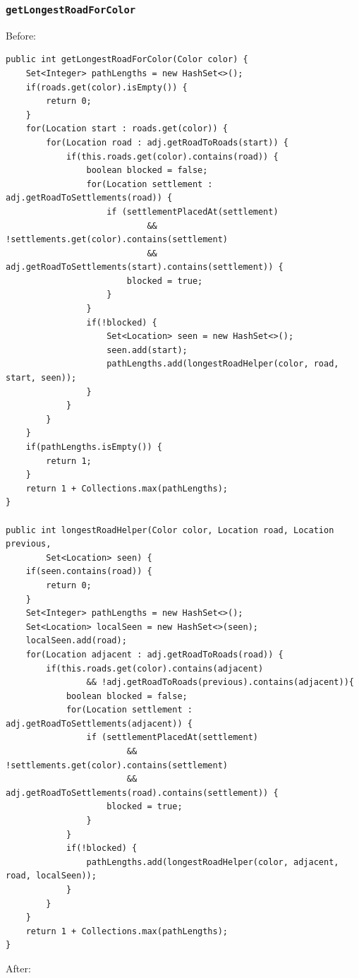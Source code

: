 \documentclass{fank1basedocument}
\begin{document}
\subsubsection*{\texttt{getLongestRoadForColor}}
Before:
\begin{lstlisting}[style=javacode,language=myJava]
public int getLongestRoadForColor(Color color) {
	Set<Integer> pathLengths = new HashSet<>();
	if(roads.get(color).isEmpty()) {
		return 0;
	}
	for(Location start : roads.get(color)) {
		for(Location road : adj.getRoadToRoads(start)) {
			if(this.roads.get(color).contains(road)) {
				boolean blocked = false;
				for(Location settlement : adj.getRoadToSettlements(road)) {
					if (settlementPlacedAt(settlement)
							&& !settlements.get(color).contains(settlement)
							&& adj.getRoadToSettlements(start).contains(settlement)) {
						blocked = true;
					}
				}
				if(!blocked) {
					Set<Location> seen = new HashSet<>();
					seen.add(start);
					pathLengths.add(longestRoadHelper(color, road, start, seen));
				}
			}
		}
	}
	if(pathLengths.isEmpty()) {
		return 1;
	}
	return 1 + Collections.max(pathLengths);
}

public int longestRoadHelper(Color color, Location road, Location previous,
		Set<Location> seen) {
	if(seen.contains(road)) {
		return 0;
	}
	Set<Integer> pathLengths = new HashSet<>();
	Set<Location> localSeen = new HashSet<>(seen);
	localSeen.add(road);
	for(Location adjacent : adj.getRoadToRoads(road)) {
		if(this.roads.get(color).contains(adjacent)
				&& !adj.getRoadToRoads(previous).contains(adjacent)){
			boolean blocked = false;
			for(Location settlement : adj.getRoadToSettlements(adjacent)) {
				if (settlementPlacedAt(settlement)
						&& !settlements.get(color).contains(settlement)
						&& adj.getRoadToSettlements(road).contains(settlement)) {
					blocked = true;
				}
			}
			if(!blocked) {
				pathLengths.add(longestRoadHelper(color, adjacent, road, localSeen));
			}
		}
	}
	return 1 + Collections.max(pathLengths);
}
\end{lstlisting}
After:
\end{document}
